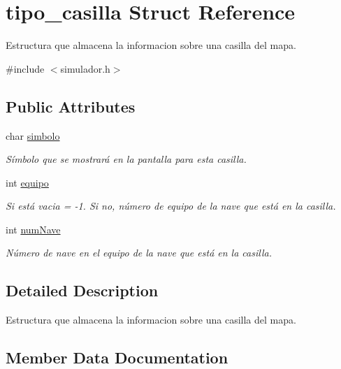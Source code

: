 \hypertarget{structtipo__casilla}{}\section{tipo\+\_\+casilla Struct Reference}
\label{structtipo__casilla}


Estructura que almacena la informacion sobre una casilla del mapa.  




{\ttfamily \#include $<$simulador.\+h$>$}

\subsection*{Public Attributes}
\begin{DoxyCompactItemize}
\item 
char \hyperlink{structtipo__casilla_a028b6f19741cf3492c595a2868175fd5}{simbolo}
\begin{DoxyCompactList}\small\item\em Símbolo que se mostrará en la pantalla para esta casilla. \end{DoxyCompactList}\item 
int \hyperlink{structtipo__casilla_aa0d456b8dc9a45dc12fd1018f971823f}{equipo}
\begin{DoxyCompactList}\small\item\em Si está vacia = -\/1. Si no, número de equipo de la nave que está en la casilla. \end{DoxyCompactList}\item 
int \hyperlink{structtipo__casilla_ac47af9369b03dd03f9fb963d0acdbf6f}{num\+Nave}
\begin{DoxyCompactList}\small\item\em Número de nave en el equipo de la nave que está en la casilla. \end{DoxyCompactList}\end{DoxyCompactItemize}


\subsection{Detailed Description}
Estructura que almacena la informacion sobre una casilla del mapa. 

\subsection{Member Data Documentation}
\mbox{\label{structtipo__casilla_aa0d456b8dc9a45dc12fd1018f971823f}} 
